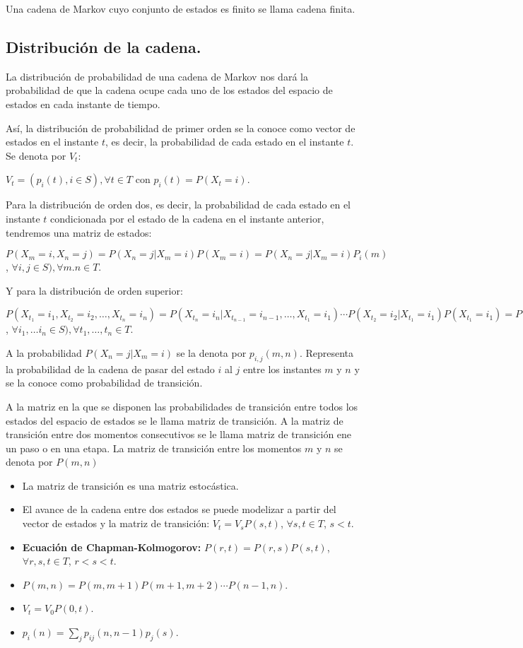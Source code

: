 Una cadena de Markov cuyo conjunto de estados es finito se llama cadena finita.

\subsection{Distribuci\'on de la cadena.}

La distribuci\'on de probabilidad de una cadena de Markov nos dar\'a la probabilidad de que la cadena ocupe cada uno de los estados del espacio de estados en cada instante de tiempo.

As\'i, la distribuci\'on de probabilidad de primer orden se la conoce como vector de estados en el instante $t$, es decir, la probabilidad de cada estado en el instante $t$. Se denota por $V_t$:

$V_t=(p_i(t), i\in S), \forall t\in T$ con $p_i(t)=P(X_t=i)$.

Para la distribuci\'on de orden dos, es decir, la probabilidad de cada estado en el instante $t$ condicionada por el estado de la cadena en el instante anterior, tendremos una matriz de estados:

$P(X_m=i, X_n=j)=P(X_n=j|X_m=i)P(X_m=i)=P(X_n=j|X_m=i)P_i(m)$, $\forall i,j\in S), \forall m.n\in T$.

Y para la distribuci\'on de orden superior:

$P(X_{t_1}=i_1,X_{t_2}=i_2,\ldots,X_{t_n}=i_n)=P(X_{t_n}=i_n|X_{t_{n-1}}=i_{n-1},\ldots,X_{t_1}=i_1)\cdots P(X_{t_2}=i_2|X_{t_1}=i_{1})P(X_{t_1}=i_1)= P(X_{t_n}=i_n|X_{t_{n-1}}=i_{n-1})\cdots P(X_{t_2}=i_2|X_{t_1}=i_{1})P(X_{t_1}=i_1)$, $\forall i_1,\ldots i_n\in S), \forall t_1, \ldots ,t_n\in T$.

A la probabilidad $P(X_n=j|X_m=i)$ se la denota por $p_{i,j}(m,n)$. Representa la probabilidad de la cadena de pasar del estado $i$ al $j$ entre los instantes $m$ y $n$ y se la conoce como probabilidad de transici\'on.

A la matriz en la que se disponen las probabilidades de transici\'on entre todos los estados del espacio de estados se le llama matriz de transici\'on. A la matriz de transici\'on entre dos momentos consecutivos se le llama matriz de transici\'on ene un paso o en una etapa. La matriz de transici\'on entre los momentos $m$ y $n$ se denota por $P(m,n)$
\begin{itemize}
\item La matriz de transici\'on es una matriz estoc\'astica.
\item El avance de la cadena entre dos estados se puede modelizar a partir del vector de estados y la matriz de transici\'on: $V_t=V_sP(s,t)$, $\forall s,t\in T$, $s<t$.
\item \textbf{Ecuaci\'on de Chapman-Kolmogorov:} $P(r,t)=P(r,s)P(s,t)$, $\forall r,s,t\in T$, $r<s<t$.
\item $P(m,n)=P(m,m+1)P(m+1,m+2)\cdots P(n-1,n)$.
\item $V_t=V_0P(0,t)$.
\item $p_i(n)=\sum_jp_{ij}(n,n-1)p_j(s)$.
\end{itemize}



